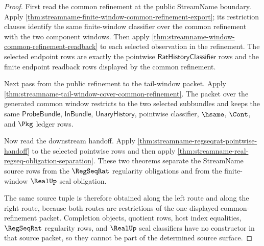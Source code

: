 \begin{proof}
First read the common refinement at the public StreamName boundary. Apply
\autoref{thm:streamname-finite-window-common-refinement-export}; its
restriction clauses identify the same finite-window classifier over the
common refinement with the two component windows. Then apply
\autoref{thm:streamname-window-common-refinement-readback} to each selected
observation in the refinement. The selected endpoint rows are exactly the
pointwise $\mathsf{RatHistoryClassifier}$ rows and the finite endpoint
readback rows displayed by the common refinement.

Next pass from the public refinement to the tail-window packet. Apply
\autoref{thm:streamname-tail-window-cover-common-refinement}. The packet over
the generated common window restricts to the two selected subbundles and keeps
the same $\mathsf{ProbeBundle}$, $\mathsf{InBundle}$,
$\mathsf{UnaryHistory}$, pointwise classifier, $\hsame$, $\Cont$, and $\Pkg$
ledger rows.

Now read the downstream handoff. Apply
\autoref{thm:streamname-regseqrat-pointwise-handoff} to the selected
pointwise rows and then apply
\autoref{thm:streamname-real-regseq-obligation-separation}. These two
theorems separate the StreamName source rows from the $\RegSeqRat$ regularity
obligations and from the finite-window $\RealUp$ seal obligation.

The same source tuple is therefore obtained along the left route and along the
right route, because both routes are restrictions of the one displayed
common-refinement packet. Completion objects, quotient rows, host index
equalities, $\RegSeqRat$ regularity rows, and $\RealUp$ seal classifiers have
no constructor in that source packet, so they cannot be part of the determined
source surface.
\end{proof}

